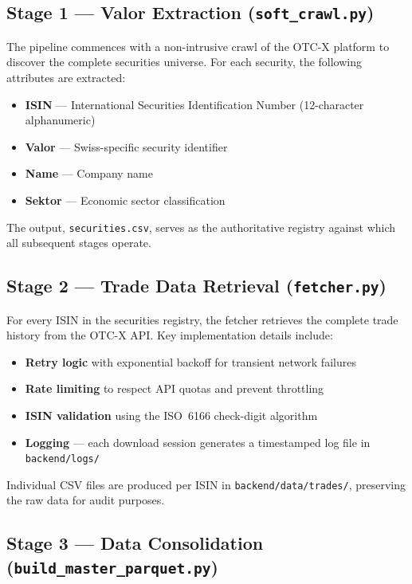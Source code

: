 \documentclass[
  11pt,
  a4paper,
  twoside,
  openany
]{report}
\begin{document}
\subsection{Stage 1 — Valor Extraction (\texttt{soft\_crawl.py})}

The pipeline commences with a non-intrusive crawl of the OTC-X platform to discover the complete securities universe.  For each security, the following attributes are extracted:

\begin{itemize}
  \item \textbf{ISIN} — International Securities Identification Number (12-character alphanumeric)
  \item \textbf{Valor} — Swiss-specific security identifier
  \item \textbf{Name} — Company name
  \item \textbf{Sektor} — Economic sector classification
\end{itemize}

The output, \texttt{securities.csv}, serves as the authoritative registry against which all subsequent stages operate.

\subsection{Stage 2 — Trade Data Retrieval (\texttt{fetcher.py})}

For every ISIN in the securities registry, the fetcher retrieves the complete trade history from the OTC-X API.  Key implementation details include:

\begin{itemize}
  \item \textbf{Retry logic} with exponential backoff for transient network failures
  \item \textbf{Rate limiting} to respect API quotas and prevent throttling
  \item \textbf{ISIN validation} using the ISO~6166 check-digit algorithm
  \item \textbf{Logging} — each download session generates a timestamped log file in \texttt{backend/logs/}
\end{itemize}

Individual CSV files are produced per ISIN in \texttt{backend/data/trades/}, preserving the raw data for audit purposes.

\subsection{Stage 3 — Data Consolidation (\texttt{build\_master\_parquet.py})}
\end{document}
